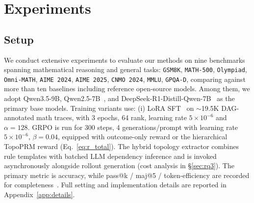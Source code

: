 

\section{Experiments}
\label{sec:experiments}

\subsection{Setup}
\label{sec:setup}
We conduct extensive experiments to evaluate our methods on nine benchmarks spanning mathematical reasoning and general tasks: \texttt{GSM8K}, \texttt{MATH-500}, \texttt{Olympiad}, \texttt{Omni-MATH}, \texttt{AIME 2024}, \texttt{AIME 2025}, \texttt{CNMO 2024}, \texttt{MMLU}, \texttt{GPQA-D}, comparing against more than ten baselines including reference open-source models.
Among them, we adopt Qwen3.5-9B, Qwen2.5-7B~\citep{yang2024qwen2_5}, and DeepSeek-R1-Distill-Qwen-7B~\citep{deepseekr1} as the primary base models. 
Training variants use: (i) LoRA SFT~\citep{vonwerra2022trl,hu2022lora} on $\sim$19.5K DAG-annotated math traces, with 3 epochs, 64 rank, learning rate $5{\times}10^{-6}$ and $\alpha{=}128$.
GRPO is run for 300 steps, 4 generations/prompt with learning rate $5{\times}10^{-6}$, $\beta{=}0.04$, equipped with outcome-only reward or the hierarchical TopoPRM reward (Eq.~\ref{eq:r_total}).
The hybrid topology extractor combines rule templates with batched LLM dependency inference and is invoked asynchronously alongside rollout generation (cost analysis in §\ref{sec:rq3}).
The primary metric is accuracy, while pass@k / maj@5 / token-efficiency are recorded for completeness~\citep{wang2023com}. Full setting and implementation details are reported in Appendix~\ref{app:details}.


